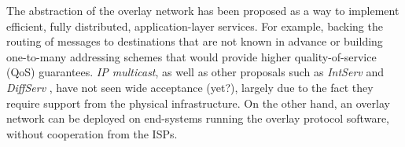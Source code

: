 The abstraction of the overlay network has been proposed as a way to implement
efficient, fully distributed, application-layer services. For example, backing
the routing of messages to destinations that are not known in advance or
building one-to-many addressing schemes
\cite{} that would provide higher quality-of-service (QoS) guarantees. \emph{IP
multicast}, as well as other proposals such as \emph{IntServ} and
\emph{DiffServ} \cite{cisco_diffserv_2005}, have not seen wide acceptance
(yet?), largely due to the fact they require support from the physical
infrastructure. On the other hand, an overlay network can be deployed on
end-systems running the overlay protocol software, without cooperation from the
ISPs.

